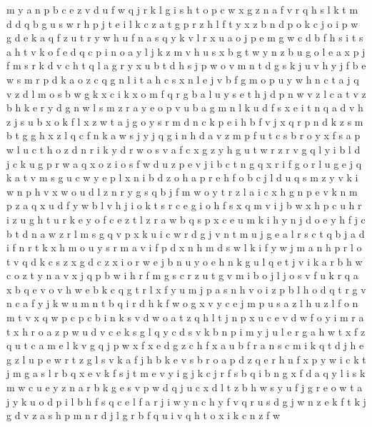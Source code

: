 \documentclass{article}
\begin{document}
m y a n p b c e z v d u f w q j r k l g i s h t o
p c w x g z n a f v r q h s l k t m d
d q b g u s w r h p j t e i l k c z a
t g p r z h l
f t y x z b n d p o k c
j o i p w g d e k a q f z u t r y
w h u f n a s
q y k v l r x u a o j p e m g w c d b f h s i t
s
a h t v k o
f e d q c p i n o a y l j k z m v h u s x b g t
w y n z b u g o l e a x p j f m s r k d v c h t q
l a g r y x u b t d h s j p w o
v m n t d g s k j
u v h y j f b e w s m r p d k a o z c q g n l i
t a h c s x n l e j v b f g m o p u y w
h n c t a j q v z d l m o s b w g k x
c i k x o m f q r g b a l u y s e t h j d p n w v z
l c a t v z b h k e r y d g n
w l s m z r a y e o p v u b
a g m n l k u d f s x e
i t n q a d v h z j s u b x o k f
l x z w t a j g o y s r m d n c k p e i h b f v
j x q r p n d k z s m b t g
g h x z l q c f n k a w s j y
j q g i n h d a v z m p f u t c s b r o y
x f s a p w l u c t h o z d n r i k y
d r w o s v a f c x g z y
h g u t w r
z r v g q l y i
b l d j c k u g p r w a q x o z i
o s f w d u z p e v j i b c t n g q x r
i f g o r l u
g e
j q k a t v m s g u c w y e p l x n i b d z o h
a p r e h f o b c j l d u q s m z y v k i w n
p h v x w o u d l z n r y g
s q b j f m w o y t r z l a i c x h g n p e v k
n m p z a q x u d f y w b l v h j i o k t s r c e g
i o h f s x
q m v i j b w x h p c u
h r i z u g
h t u r k e y o
f c e z
t l z r a w b q s p x c e u m k i h y n j d o
e y h f j c b t d n a w z r l m s g q v p x k u i
c w r d g j v n t
m u j g e a l r s c t q b
j a d i f n r t k x h m o u y s
r m a v i f p d x n h
m d s w l k
i f y w j m a n h p r l o t v q d k c s z x g
d c z x i o r w e j b n u
y o e h n k g u l
q e t j v i k a r b h w c o z
t y n a v x j q p b w i h r f m g s c
r z u t g v m i b o j
l j o s v f u k r q a
x b q e
v o
v h
w e b k c q g t r l x f y u m j p a s n h v o i z
p b l h o d q t r g v n c a f y j k w u m
n t b q i r d h k f w o g x v y c e j m p u s a z l
h u z l f o n m t v x q w p c
p c b i n k s v d w o a t
z q h l t j n p x u c e v d w f o y i m r a
t x h r o a z p w u d v c e k s g l q y
c d s v k b n p i m y j u l e r g a h w t x f z q
u t c a m e l k v g q j p w x f
x e d g z c h
f x a u
b f r a n s c m i k q t d j h e g z l u p
e w r t z g l s v k a f j h b
k e v s b
r o a p
d z q e r h n f x p y w i c k t j m g a s
l r b q x e v k f s j
t m e v y i g j k c
j r f s b q i
b n g x f d a q y l i s k m w c u e
y z n a r b k g e s v p w d q j u
c x d l t z b h w s y u f j g r e o
w t a j y k u o d p i l b h f
s q c e l f a r j i w y n
c h y f v q r u s d g j w n z e k
f t k j g d v z a s h p m n r
d j l g r b f q u i
v q h t o x i k c n z f w
\end{document}
